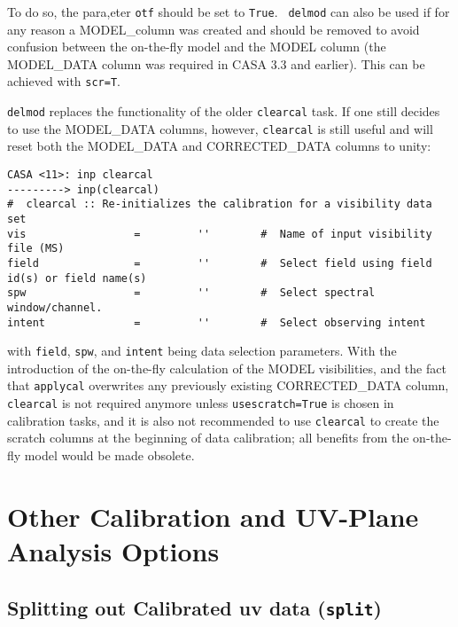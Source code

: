 {To do so, the para,eter {\tt otf} should be set to {\tt True}. {\tt
  delmod} can also be used if for any reason a MODEL\_column was
created and should be removed to avoid confusion between the
on-the-fly model and the MODEL column (the MODEL\_DATA column was
required in CASA 3.3 and earlier). This can be achieved with {\tt scr=T}.


{\tt delmod} replaces the functionality of the older {\tt clearcal}
task. If one still decides to use the MODEL\_DATA columns, however,
{\tt clearcal} is still useful and will reset both the MODEL\_DATA and
CORRECTED\_DATA columns to unity:

\small
\begin{verbatim}
CASA <11>: inp clearcal
---------> inp(clearcal)
#  clearcal :: Re-initializes the calibration for a visibility data set
vis                 =         ''        #  Name of input visibility file (MS)
field               =         ''        #  Select field using field id(s) or field name(s)
spw                 =         ''        #  Select spectral window/channel.
intent              =         ''        #  Select observing intent

\end{verbatim}
\normalsize

with {\tt field}, {\tt spw}, and {\tt intent} being data selection
parameters. With the introduction of the on-the-fly calculation of the
MODEL visibilities, and the fact that {\tt applycal} overwrites any
previously existing CORRECTED\_DATA column, {\tt clearcal} is not
required anymore unless {\tt usescratch=True} is chosen in calibration
tasks, and it is also not recommended to use {\tt clearcal} to create
the scratch columns at the beginning of data calibration; all benefits
from the on-the-fly model would be made obsolete.

\section{Other Calibration and UV-Plane Analysis Options}
\label{section:cal.other}

\subsection{Splitting out Calibrated uv data ({\tt split})}
\label{section:cal.other.split}

}
